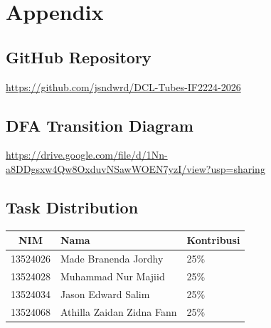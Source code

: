 \documentclass[11pt,a4paper]{article}
\begin{document}
\section*{Appendix}

\subsection*{GitHub Repository}

\url{https://github.com/jsndwrd/DCL-Tubes-IF2224-2026}

\subsection*{DFA Transition Diagram}

\url{https://drive.google.com/file/d/1Nn-a8DDgsxw4Qw8OxduvNSawWOEN7yzI/view?usp=sharing}

\subsection*{Task Distribution}

\begin{table}[H]
    \centering
    \begin{tabularx}{\textwidth}{clX}
        \toprule
        \textbf{NIM} & \textbf{Nama} & \textbf{Kontribusi} \\
        \midrule
            13524026 & Made Branenda Jordhy      & 25\% \\
            13524028 & Muhammad Nur Majiid       & 25\% \\
            13524034 & Jason Edward Salim        & 25\% \\
            13524068 & Athilla Zaidan Zidna Fann & 25\% \\
        \bottomrule
    \end{tabularx}
\end{table}
\end{document}
